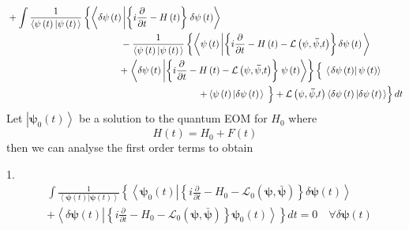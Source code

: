 \documentclass[aps,preprint]{revtex4}%
\begin{document}
\begin{align}
&  +\int\frac{1}{\left\langle \mathbf{\psi}\left(  t\right)  \left\vert
\mathbf{\psi}\left(  t\right)  \right.  \right\rangle }\left\{  \left\langle
\delta\mathbf{\psi}\left(  t\right)  \left\vert \left\{  i\frac{\partial
}{\partial t}-H\left(  t\right)  \right\}  \right.  \delta\mathbf{\psi}\left(
t\right)  \right\rangle \right.  \nonumber\\
&  \qquad\qquad\qquad\qquad\qquad\qquad-\frac{1}{\left\langle \mathbf{\psi
}\left(  t\right)  \left\vert \mathbf{\psi}\left(  t\right)  \right.
\right\rangle }\left\{  \left\langle \mathbf{\psi}\left(  t\right)  \left\vert
\left\{  i\frac{\partial}{\partial t}-H\left(  t\right)  -\mathcal{L}\left(
\mathbf{\psi},\mathbf{\bar{\psi},}t\right)  \right\}  \delta\mathbf{\psi
}\left(  t\right)  \right.  \right\rangle \right.  \nonumber\\
&  \qquad\qquad\qquad\qquad\qquad\qquad\mathbf{+}\left.  \left\langle
\delta\mathbf{\psi}\left(  t\right)  \left\vert \left\{  i\frac{\partial
}{\partial t}-H\left(  t\right)  -\mathcal{L}\left(  \mathbf{\psi
},\mathbf{\bar{\psi},}t\right)  \right\}  \right.  \mathbf{\psi}\left(
t\right)  \right\rangle \right\}  \left\{
\genfrac{}{}{0pt}{}{{}}{{}}%
\left\langle \left.  \delta\mathbf{\psi}\left(  t\right)  \right\vert
\mathbf{\psi}\left(  t\right)  \right\rangle \right.  \nonumber\\
&  \qquad\qquad\qquad\qquad\qquad\qquad\qquad\qquad\qquad\qquad\left.  \left.
+\left\langle \mathbf{\psi}\left(  t\right)  \left\vert \delta\mathbf{\psi
}\left(  t\right)  \right.  \right\rangle
\genfrac{}{}{0pt}{}{{}}{{}}%
\right\}  +\mathcal{L}\left(  \mathbf{\psi},\mathbf{\bar{\psi},}t\right)
\left\langle \delta\mathbf{\psi}\left(  t\right)  \left\vert \delta
\mathbf{\psi}\left(  t\right)  \right.  \right\rangle \right\}  dt
\end{align}
Let $\left\vert \mathbf{\psi}_{0}\left(  t\right)  \right\rangle $ be a
solution to the quantum EOM for $H_{0}$ where
\begin{equation}
H\left(  t\right)  =H_{0}+F\left(  t\right)
\end{equation}
then we can analyse the first order terms to obtain 

1.
\begin{align}
&  \int\frac{1}{\left\langle \mathbf{\psi}\left(  t\right)  \left\vert
\mathbf{\psi}\left(  t\right)  \right.  \right\rangle }\left\{  \left\langle
\mathbf{\psi}_{0}\left(  t\right)  \left\vert \left\{  i\frac{\partial
}{\partial t}-H_{0}-\mathcal{L}_{0}\left(  \mathbf{\psi},\mathbf{\bar{\psi}%
}\right)  \right\}  \delta\mathbf{\psi}\left(  t\right)  \right.
\right\rangle \right.  \nonumber\\
&  \mathbf{+}\left.  \left\langle \delta\mathbf{\psi}\left(  t\right)
\left\vert \left\{  i\frac{\partial}{\partial t}-H_{0}-\mathcal{L}_{0}\left(
\mathbf{\psi},\mathbf{\bar{\psi}}\right)  \right\}  \right.  \mathbf{\psi}%
_{0}\left(  t\right)  \right\rangle \right\}  dt=0\quad\forall\delta
\mathbf{\psi}\left(  t\right)
\end{align}
\end{document}
